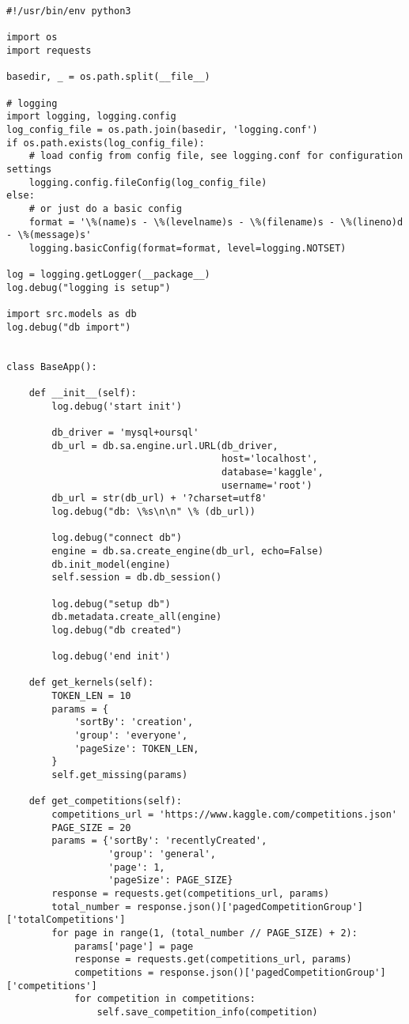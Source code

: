 \begin{lstlisting}[style=app]
#!/usr/bin/env python3

import os
import requests

basedir, _ = os.path.split(__file__)

# logging
import logging, logging.config
log_config_file = os.path.join(basedir, 'logging.conf')
if os.path.exists(log_config_file):
    # load config from config file, see logging.conf for configuration settings
    logging.config.fileConfig(log_config_file)
else:
    # or just do a basic config
    format = '\%(name)s - \%(levelname)s - \%(filename)s - \%(lineno)d - \%(message)s'
    logging.basicConfig(format=format, level=logging.NOTSET)

log = logging.getLogger(__package__)
log.debug("logging is setup")

import src.models as db
log.debug("db import")


class BaseApp():

    def __init__(self):
        log.debug('start init')

        db_driver = 'mysql+oursql'
        db_url = db.sa.engine.url.URL(db_driver,
                                      host='localhost',
                                      database='kaggle',
                                      username='root')
        db_url = str(db_url) + '?charset=utf8'
        log.debug("db: \%s\n\n" \% (db_url))

        log.debug("connect db")
        engine = db.sa.create_engine(db_url, echo=False)
        db.init_model(engine)
        self.session = db.db_session()

        log.debug("setup db")
        db.metadata.create_all(engine)
        log.debug("db created")

        log.debug('end init')

    def get_kernels(self):
        TOKEN_LEN = 10
        params = {
            'sortBy': 'creation',
            'group': 'everyone',
            'pageSize': TOKEN_LEN,
        }
        self.get_missing(params)

    def get_competitions(self):
        competitions_url = 'https://www.kaggle.com/competitions.json'
        PAGE_SIZE = 20
        params = {'sortBy': 'recentlyCreated',
                  'group': 'general',
                  'page': 1,
                  'pageSize': PAGE_SIZE}
        response = requests.get(competitions_url, params)
        total_number = response.json()['pagedCompetitionGroup']['totalCompetitions']
        for page in range(1, (total_number // PAGE_SIZE) + 2):
            params['page'] = page
            response = requests.get(competitions_url, params)
            competitions = response.json()['pagedCompetitionGroup']['competitions']
            for competition in competitions:
                self.save_competition_info(competition)


\end{lstlisting}
